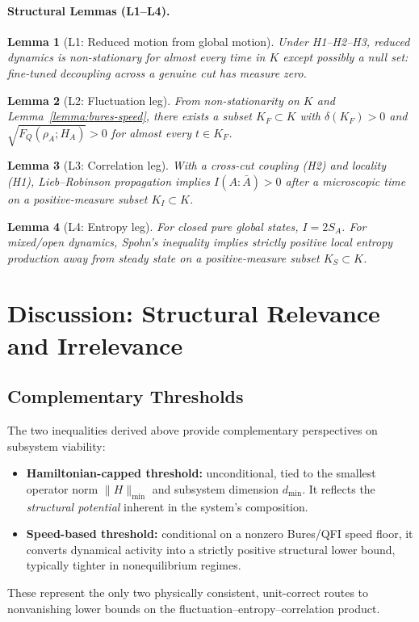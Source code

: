 \documentclass[10pt]{article}
\newtheorem{lemma}{Lemma}
\begin{document}
\paragraph{Structural Lemmas (L1–L4).}
\begin{lemma}[L1: Reduced motion from global motion]
Under H1–H2–H3, reduced dynamics is non-stationary for almost every time in $K$ except possibly a null set: fine-tuned decoupling across a genuine cut has measure zero.
\end{lemma}
\begin{lemma}[L2: Fluctuation leg]
From non-stationarity on $K$ and Lemma~\ref{lemma:bures-speed}, there exists a subset $K_F\subset K$ with $\delta(K_F)>0$ and $\sqrt{F_Q(\rho_A;H_A)}>0$ for almost every $t\in K_F$.
\end{lemma}
\begin{lemma}[L3: Correlation leg]
With a cross-cut coupling (H2) and locality (H1), Lieb–Robinson propagation implies $I(A:\bar A)>0$ after a microscopic time on a positive-measure subset $K_I\subset K$.
\end{lemma}
\begin{lemma}[L4: Entropy leg]
For closed pure global states, $I=2S_A$. For mixed/open dynamics, Spohn's inequality implies strictly positive local entropy production away from steady state on a positive-measure subset $K_S\subset K$.
\end{lemma}

\section{Discussion: Structural Relevance and Irrelevance}

\subsection{Complementary Thresholds}
The two inequalities derived above provide complementary perspectives on subsystem viability:
\begin{itemize}
    \item \textbf{Hamiltonian-capped threshold:} unconditional, tied to the smallest operator norm
    $\|H\|_{\min}$ and subsystem dimension $d_{\min}$. It reflects the \emph{structural potential}
    inherent in the system's composition.
    \item \textbf{Speed-based threshold:} conditional on a nonzero Bures/QFI speed floor, it converts
    dynamical activity into a strictly positive structural lower bound, typically tighter in
    nonequilibrium regimes.
\end{itemize}
These represent the only two physically consistent, unit-correct routes to nonvanishing lower bounds on
the fluctuation–entropy–correlation product.
\end{document}
